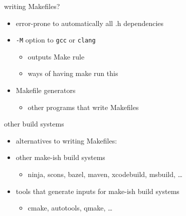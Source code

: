 \begin{frame}{writing Makefiles?}
\begin{itemize}
\item error-prone to automatically all .h dependencies
\vspace{.5cm}
\item \texttt{-M} option to \texttt{gcc} or \texttt{clang}
    \begin{itemize}
    \item outputs Make rule
    \item ways of having make run this
    \end{itemize}
\item Makefile generators
    \begin{itemize}
    \item other programs that write Makefiles
    \end{itemize}
\end{itemize}
\end{frame}

\begin{frame}{other build systems}
\begin{itemize}
\item alternatives to writing Makefiles:
\vspace{.25cm}
\item other make-ish build systems
    \begin{itemize}
    \item ninja, scons, bazel, maven, xcodebuild, msbuild, \ldots
    \end{itemize}
\item tools that generate inputs for make-ish build systems
    \begin{itemize}
    \item cmake, autotools, qmake, \ldots
    \end{itemize}
\end{itemize}
\end{frame}
